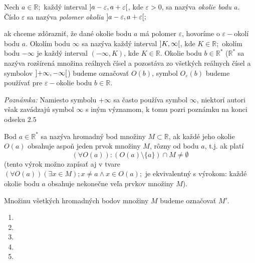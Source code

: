 Nech $a \in \mathbb{R};$ každý interval
$\interval[open]{a - \varepsilon}{a + \varepsilon}$,
kde $\varepsilon > 0$, sa nazýva \textit{okolie bodu $a$}. Číslo $\varepsilon$
sa nazýva \textit{polomer okolia}
$\interval[open]{a - \varepsilon}{a + \varepsilon};$

ak chceme zdôrazniť, že dané okolie bodu $a$ má polomer $\varepsilon$, hovoríme
o $\varepsilon-$okolí bodu $a$. Okolím bodu $\infty$ sa nazýva každý interval
$\interval[open]{K}{\infty}$, kde $K \in \mathbb{R};$ okolím bodu $- \infty$ je
každý interval $(- \infty,K)$, kde $K \in \mathbb{R}.$ Okolie bodu $b \in
\mathbb{R^*}$ ($\mathbb{R^*}$ sa nazýva rozšírená množina reálnych čísel a
pozostáva zo všetkých reálnych čísel a symbolov
$\interval[open]{+\infty}{-\infty}$) budeme označovať $O(b)$, symbol
$O_\varepsilon (b)$ budeme používať pre $\varepsilon-$okolie bodu $b \in
\mathbb{R}$.

\textit{Poznámka:} Namiesto symbolu $+\infty$ sa často používa symbol $\infty$,
niektorí autori však zavádzajú symbol $\infty$ s iným významom, k tomu pozri
poznámku na konci odseku $2.5$

Bod $a \in \mathbb{R^*}$ sa nazýva hromadný bod množiny $M \subset \mathbb{R}$,
ak každé jeho okolie $O(a)$ obsahuje aspoň jeden prvok množiny $M$, rôzny od
bodu $a$, t.j. ak platí
\[
  (\forall O(a)): (O(a) \setminus \{ a \}) \cap M \neq \emptyset
\]
(tento výrok možno zapísať aj v tvare $(\forall O(a))(\exists x\in M); x \neq a
\wedge x \in O(a);$ je ekvivalentný s výrokom: každé okolie bodu $a$ obsahuje
nekonečne veľa prvkov množiny $M$).

Množinu všetkých hromadných bodov množiny $M$ budeme označovať $M'$.
\begin{enumerate}[resume]
  \item {}
  \item {}
  \item {}
  \item {}
  \item {}
\end{enumerate}
